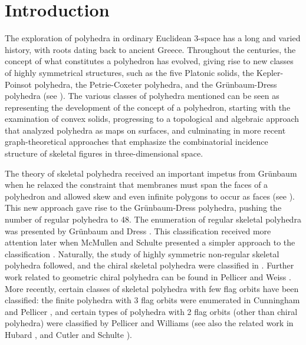 \documentclass[12pt]{article}
\theoremstyle{definition}\newtheorem{definition}{Definition}[section]
\begin{document}
\section{Introduction}
\label{intro}

The exploration of polyhedra in ordinary Euclidean 3-space has a long and varied history, with roots dating back to ancient Greece. Throughout the centuries, the concept of what constitutes a polyhedron has evolved, giving rise to new classes of highly symmetrical structures, such as the five Platonic solids, the Kepler-Poinsot polyhedra, the Petrie-Coxeter polyhedra, and the Grünbaum-Dress polyhedra (see \cite{5,7,18,19,22}). The various classes of polyhedra mentioned can be seen as representing the development of the concept of a polyhedron, starting with the examination of convex solids, progressing to a topological and algebraic approach that analyzed polyhedra as maps on surfaces, and culminating in more recent graph-theoretical approaches that emphasize the combinatorial incidence structure of skeletal figures in three-dimensional space.\smallskip

The theory of skeletal polyhedra received an important impetus from Grünbaum when he relaxed the constraint that membranes must span the faces of a polyhedron and allowed skew and even infinite polygons to occur as faces (see \cite{22}). This new approach gave rise to the Grünbaum-Dress polyhedra, pushing the number of regular polyhedra to 48. The enumeration of regular skeletal polyhedra was presented by Grünbaum \cite{22} and Dress \cite{18,19}. This classification received more attention later when McMullen and Schulte presented a simpler approach to the classification \cite{40,41}. Naturally, the study of highly symmetric non-regular skeletal polyhedra followed, and the chiral skeletal polyhedra were classified in \cite{Chiral 1, Chiral 2}. Further work related to geometric chiral polyhedra can be found in Pellicer and Weiss \cite{47}. More recently, certain classes of skeletal polyhedra with few flag orbits have been classified: the finite polyhedra with 3 flag orbits were enumerated in Cunningham and Pellicer \cite{CuPe,CuPe2}, and certain types of polyhedra with 2 flag orbits (other than chiral polyhedra) were classified by Pellicer and Williams \cite{PeWi} (see also the related work in Hubard \cite{Hu}, and Cutler and Schulte \cite{14}).
\smallskip
\end{document}
